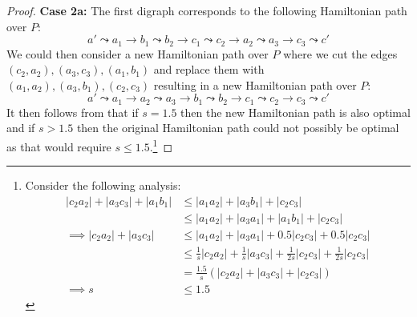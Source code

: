 \documentclass{article}
\theoremstyle{definition}
\begin{document}
\begin{proof}
    \textbf{Case 2a:} The first digraph corresponds to the following Hamiltonian path over $P$:
    $$a' \leadsto a_1 \to b_1 \leadsto b_2 \to c_1 \leadsto c_2 \to a_2 \leadsto a_3 \to c_3 \leadsto c'$$
    We could then consider a new Hamiltonian path over $P$ where we cut the edges $(c_2, a_2), (a_3, c_3), (a_1, b_1)$ and replace them with $(a_1, a_2), (a_3, b_1), (c_2, c_3)$ resulting in a new Hamiltonian path over $P$:
    $$a' \leadsto a_1 \to a_2 \leadsto a_3 \to b_1 \leadsto b_2 \to c_1 \leadsto c_2 \to c_3 \leadsto c'$$
    It then follows from  that if $s = 1.5$ then the new Hamiltonian path is also optimal and if $s > 1.5$ then the original Hamiltonian path could not possibly be optimal as that would require $s \leq 1.5$.\footnote{Consider the following analysis:
        \begin{align*}
            |c_2 a_2| + |a_3 c_3| + |a_1 b_1| &\leq |a_1 a_2| + |a_3 b_1| + |c_2 c_3| \\
            &\leq |a_1 a_2| + |a_3 a_1| + |a_1 b_1| + |c_2 c_3| \\
            \implies |c_2 a_2| + |a_3 c_3| &\leq |a_1 a_2| + |a_3 a_1| + 0.5 |c_2 c_3| + 0.5 |c_2 c_3| \\
            &\leq \frac{1}{s} |c_2 a_2| + \frac{1}{s} |a_3 c_3| + \frac{1}{2s} |c_2 c_3| + \frac{1}{2s} |c_2 c_3| \\
            &= \frac{1.5}{s} (|c_2 a_2| + |a_3 c_3| + |c_2 c_3|) \\
            \implies s &\leq 1.5
        \end{align*}
    }


\end{proof}
\end{document}
